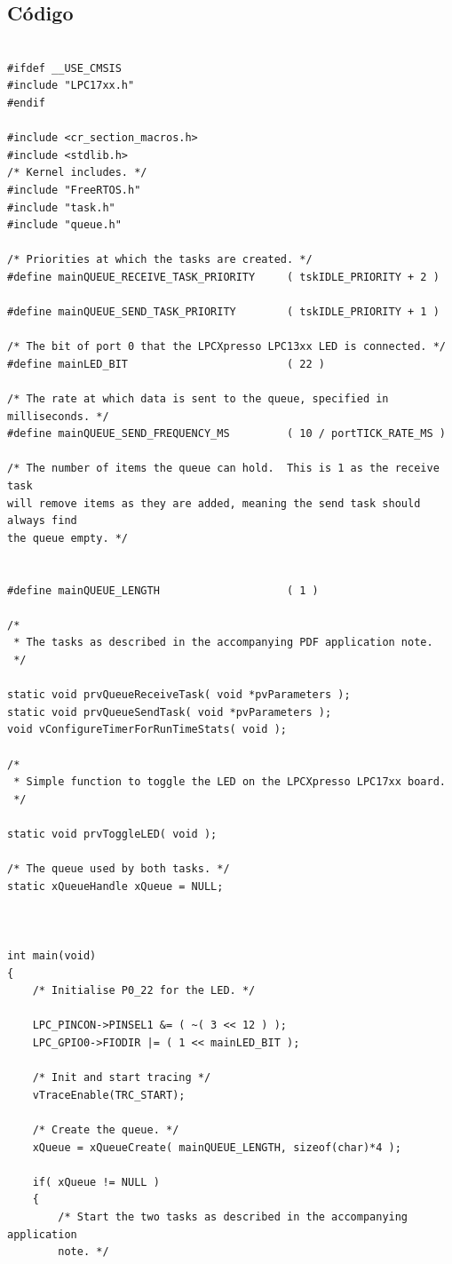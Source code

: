 \documentclass{article}
\begin{document}
\subsection{Código}
\begin{lstlisting}[style=CStyle]

#ifdef __USE_CMSIS
#include "LPC17xx.h"
#endif

#include <cr_section_macros.h>
#include <stdlib.h>
/* Kernel includes. */
#include "FreeRTOS.h"
#include "task.h"
#include "queue.h"

/* Priorities at which the tasks are created. */
#define mainQUEUE_RECEIVE_TASK_PRIORITY		( tskIDLE_PRIORITY + 2 )

#define	mainQUEUE_SEND_TASK_PRIORITY		( tskIDLE_PRIORITY + 1 )

/* The bit of port 0 that the LPCXpresso LPC13xx LED is connected. */
#define mainLED_BIT 						( 22 )

/* The rate at which data is sent to the queue, specified in milliseconds. */
#define mainQUEUE_SEND_FREQUENCY_MS			( 10 / portTICK_RATE_MS )

/* The number of items the queue can hold.  This is 1 as the receive task
will remove items as they are added, meaning the send task should always find
the queue empty. */


#define mainQUEUE_LENGTH					( 1 )

/*
 * The tasks as described in the accompanying PDF application note.
 */
 
static void prvQueueReceiveTask( void *pvParameters );
static void prvQueueSendTask( void *pvParameters );
void vConfigureTimerForRunTimeStats( void );

/*
 * Simple function to toggle the LED on the LPCXpresso LPC17xx board.
 */
 
static void prvToggleLED( void );

/* The queue used by both tasks. */
static xQueueHandle xQueue = NULL;



int main(void)
{
	/* Initialise P0_22 for the LED. */
	
	LPC_PINCON->PINSEL1	&= ( ~( 3 << 12 ) );
	LPC_GPIO0->FIODIR |= ( 1 << mainLED_BIT );

	/* Init and start tracing */
	vTraceEnable(TRC_START);

	/* Create the queue. */
	xQueue = xQueueCreate( mainQUEUE_LENGTH, sizeof(char)*4 );

	if( xQueue != NULL )
	{
		/* Start the two tasks as described in the accompanying application
		note. */
		

\end{lstlisting}
\end{document}
